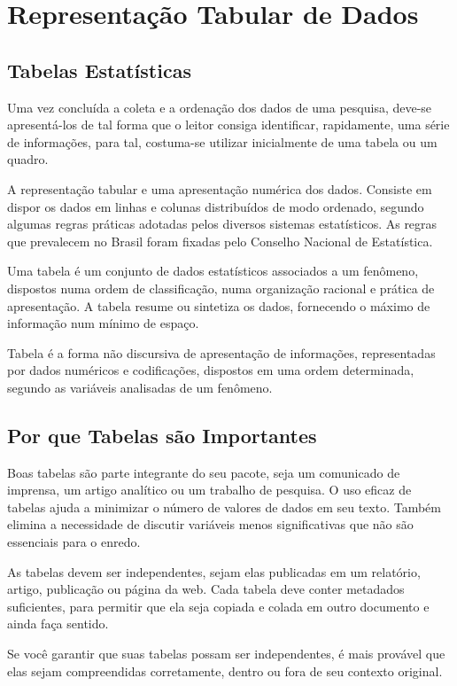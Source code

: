 \chapter{Representação Tabular de Dados}
\section{Tabelas Estatísticas}

\inic Uma vez concluída a coleta e a ordenação dos dados de uma pesquisa, deve-se apresentá-los de tal forma que o leitor consiga identificar, rapidamente, uma série de informações, para tal, costuma-se utilizar inicialmente de uma tabela ou um quadro.\vskip0.3cm

\inic A representação tabular e uma apresentação numérica dos dados. Consiste em dispor os dados em linhas e colunas distribuídos de modo ordenado, segundo algumas regras práticas adotadas pelos diversos sistemas estatísticos. As regras que prevalecem no Brasil foram fixadas pelo Conselho Nacional de Estatística.\vskip0.3cm

\inic Uma tabela é um conjunto de dados estatísticos associados a um fenômeno, dispostos numa ordem de classificação, numa organização racional e prática de apresentação. A tabela resume ou sintetiza os dados, fornecendo o máximo de informação num mínimo de espaço.\vskip0.3cm

\inic Tabela é a forma não discursiva de apresentação de informações, representadas por dados numéricos e codificações, dispostos em uma ordem determinada, segundo as variáveis analisadas de um fenômeno.

\section{Por que Tabelas são Importantes}

\inic Boas tabelas são parte integrante do seu pacote, seja um comunicado de imprensa, um artigo analítico ou um trabalho de pesquisa. O uso eficaz de tabelas ajuda a minimizar o número de valores de dados em seu texto. Também elimina a necessidade de discutir variáveis ​​menos significativas que não são essenciais para o enredo.\vskip0.3cm

As tabelas devem ser independentes, sejam elas publicadas em um relatório, artigo, publicação ou página da web. Cada tabela deve conter metadados suficientes, para permitir que ela seja copiada e colada em outro documento e ainda faça sentido.\vskip0.3cm

Se você garantir que suas tabelas possam ser independentes, é mais provável que elas sejam compreendidas corretamente, dentro ou fora de seu contexto original.\vst

